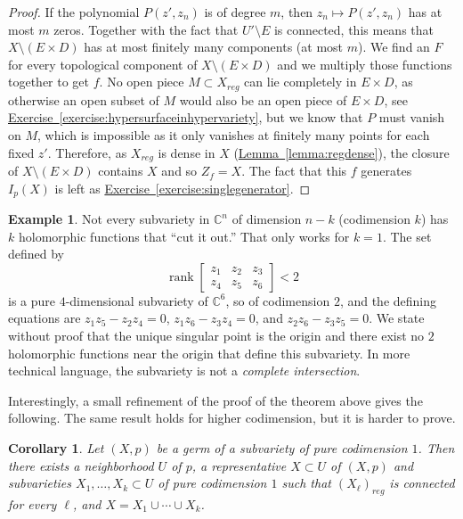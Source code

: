 \documentclass[12pt,openany]{book}
\newcommand{\C}{{\mathbb{C}}}
\newcommand{\rank}{\operatorname{rank}}
\newcommand{\myindex}[1]{#1\index{#1}}
\theoremstyle{plain}
\newtheorem{cor}[thm]{Corollary}
\theoremstyle{remark}
\theoremstyle{definition}
\theoremstyle{exercise}
\theoremstyle{example}
\newtheorem{example}[thm]{Example}
\newcommand{\exerciseref}[1]{\hyperref[#1]{Exercise~\ref*{#1}}}
\newcommand{\lemmaref}[1]{\hyperref[#1]{Lemma~\ref*{#1}}}
\begin{document}
\begin{proof}
If the polynomial $P(z',z_n)$ is of degree $m$,
then $z_n \mapsto P(z',z_n)$ has at most $m$ zeros.  Together with
the fact that $U' \setminus E$ is connected, this means that
$X \setminus (E \times D)$ has at most finitely many components (at
most $m$).
We find an $F$ for every topological component of $X \setminus ( E \times D )$
and we multiply those functions together to get $f$.
No open piece $M \subset X_{\mathit{reg}}$ can lie completely in $E \times D$,
as otherwise an open subset of $M$ would also be an open piece of $E \times D$,
see \exerciseref{exercise:hypersurfaceinhypervariety},
but we know that $P$ must vanish on $M$, which is impossible as
it only vanishes at finitely
many points for each fixed $z'$.
Therefore, as $X_{\mathit{reg}}$ is dense in $X$ (\lemmaref{lemma:regdense}),
the closure of $X \setminus (E \times D)$ contains $X$ and so $Z_f = X$.
The fact that this $f$ generates $I_p(X)$ is left as
\exerciseref{exercise:singlegenerator}.
\end{proof}

\begin{example}
Not every subvariety in $\C^n$ of dimension $n-k$ (codimension $k$)
has $k$
holomorphic functions that ``cut it out.''  That only works for $k=1$.
The set defined by
\begin{equation*}
\rank
\begin{bmatrix}
z_1 & z_2 & z_3 \\
z_4 & z_5 & z_6
\end{bmatrix}
< 2
\end{equation*}
is a pure $4$-dimensional subvariety of $\C^6$, so of codimension $2$,
and the defining equations are
$z_1z_5-z_2z_4 = 0$,
$z_1z_6-z_3z_4 = 0$, and
$z_2z_6-z_3z_5 = 0$.  We state without proof that the unique singular point is the origin and there exist
no $2$ holomorphic functions near the origin
that define this subvariety.  In more technical
language, the subvariety is not a \emph{\myindex{complete intersection}}.
\end{example}

Interestingly, a small refinement of the proof of the theorem above gives
the following.
The same result holds
for higher codimension, but it is harder to prove.

\begin{cor}
Let $(X,p)$ be a germ of a subvariety of pure codimension $1$.  Then there exists
a neighborhood $U$ of $p$, a representative $X \subset U$ of $(X,p)$
and subvarieties $X_1,\ldots,X_k \subset U$
of pure codimension $1$ such that $(X_\ell)_{\mathit{reg}}$ is connected for
every $\ell$, and
$X = X_1 \cup \cdots \cup X_k$.
\end{cor}
\end{document}
